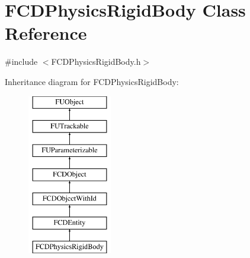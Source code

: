 \hypertarget{classFCDPhysicsRigidBody}{
\section{FCDPhysicsRigidBody Class Reference}
\label{classFCDPhysicsRigidBody}
}


{\ttfamily \#include $<$FCDPhysicsRigidBody.h$>$}

Inheritance diagram for FCDPhysicsRigidBody:\begin{figure}[H]
\begin{center}
\leavevmode
\includegraphics[height=7.000000cm]{classFCDPhysicsRigidBody}
\end{center}
\end{figure}
